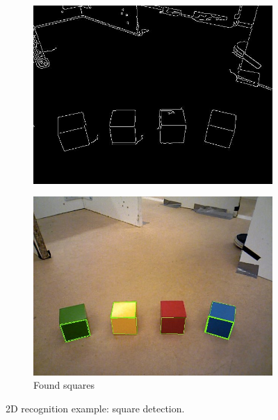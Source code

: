 \begin{figure}[h]
        \centering
        \begin{subfigure}[b]{0.4\linewidth}
                \includegraphics[width=\textwidth]{figures/canny.jpg}
                \label{fig:ryan1}
        \end{subfigure}
        \begin{subfigure}[b]{0.4\linewidth}
                \includegraphics[width=\textwidth]{figures/squares.jpg}
                \caption{Found squares}
                \label{fig:ryan2}
        \end{subfigure}
        \caption{2D recognition example: square detection.}
\end{figure}


